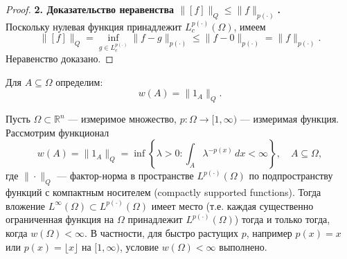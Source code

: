 \documentclass[../NDCNNAI_main.tex]{subfiles}
\begin{document}
\begin{proof}
\textbf{2. Доказательство неравенства \( \|[f]\|_Q \leq \|f\|_{p(\cdot)} \).}\\
Поскольку нулевая функция принадлежит \( L_c^{p(\cdot)}(\Omega) \), имеем
\[
\|[f]\|_Q = \inf_{g \in L_c^{p(\cdot)}} \|f - g\|_{p(\cdot)} \leq \|f - 0\|_{p(\cdot)} = \|f\|_{p(\cdot)}.
\]
Неравенство доказано.
\end{proof}

\begin{definition}
Для \( A \subseteq \Omega \) определим:
\[
w(A) = \|1_A\|_Q.
\]
\end{definition}

\begin{theorem}
Пусть \( \Omega \subset \mathbb{R}^n \) --- измеримое множество, \( p \colon \Omega \to [1, \infty) \) --- измеримая функция. Рассмотрим функционал
\[
w(A) = \|1_A\|_Q = \inf\left\{ \lambda > 0 \colon \int_A \lambda^{-p(x)} \, dx < \infty \right\}, \quad A \subseteq \Omega,
\]
где \( \| \cdot \|_Q \) --- фактор-норма в пространстве \( L^{p(\cdot)}(\Omega) \) по подпространству функций с компактным носителем (compactly supported functions). Тогда вложение \( L^\infty(\Omega) \subset L^{p(\cdot)}(\Omega) \) имеет место (т.е. каждая существенно ограниченная функция на \( \Omega \) принадлежит \( L^{p(\cdot)}(\Omega) \)) тогда и только тогда, когда \( w(\Omega) < \infty \). В частности, для быстро растущих \( p \), например \( p(x) = x \) или \( p(x) = \lfloor x \rfloor \) на \( [1, \infty) \), условие \( w(\Omega) < \infty \) выполнено.
\end{theorem}
\end{document}
